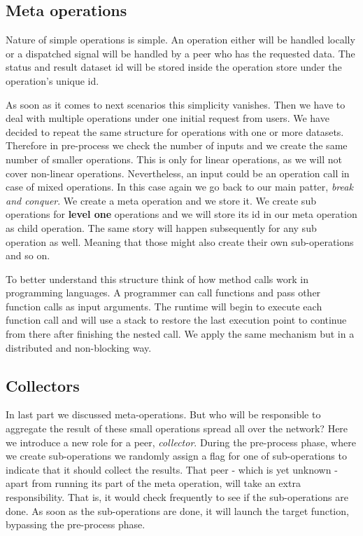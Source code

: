\subsection{Meta operations}
Nature of simple operations is simple. 
An operation either will be handled locally or a dispatched signal will be handled
by a peer who has the requested data. 
The status and result dataset id will be stored inside the operation store under the operation's unique id.

As soon as it comes to next scenarios this simplicity vanishes. 
Then we have to deal with multiple operations under one initial request from users.
We have decided to repeat the same structure for operations with one or more datasets.
Therefore in pre-process we check the number of inputs and we create the same number of
smaller operations. 
This is only for linear operations, as we will not cover non-linear operations.
Nevertheless, an input could be an operation call in case of mixed operations.
In this case again we go back to our main patter, \textit{break and conquer}. 
We create a meta operation and we store it. 
We create sub operations for \textbf{level one} operations and we will store its id 
in our meta operation as child operation. 
The same story will happen subsequently for any sub operation as well. 
Meaning that those might also create their own sub-operations and so on.

To better understand this structure think of how method calls work in programming languages.
A programmer can call functions and pass other function calls as input arguments.
The runtime will begin to execute each function call and will use a stack to restore
the last execution point to continue from there after finishing the nested call.
We apply the same mechanism but in a distributed and non-blocking way.

\subsection{Collectors}
In last part we discussed meta-operations. 
But who will be responsible to aggregate the result of these small operations spread all over the network? 
Here we introduce a new role for a peer, \textit{collector}. 
During the pre-process phase, where we create sub-operations we randomly assign
a flag for one of sub-operations to indicate that it should collect the results. 
That peer - which is yet unknown - apart from running its part of the meta operation,
will take an extra responsibility. That is, it would check frequently to see if the
sub-operations are done. As soon as the sub-operations are done, it will
launch the target function, bypassing the pre-process phase.

